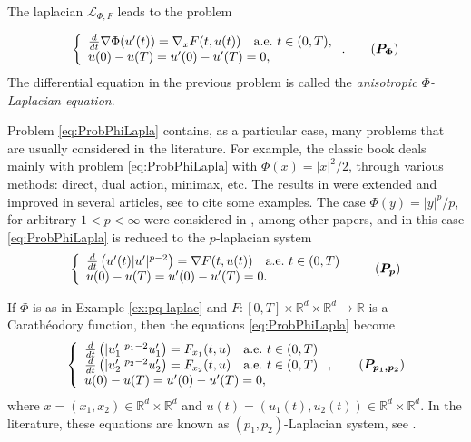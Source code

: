 \documentclass[twoside]{article}
\theoremstyle{remark}
\renewcommand{\b}[1]{\boldsymbol{#1}}
\newcommand{\rr}{\mathbb{R}}
\newcounter{example}[section]
\begin{document}
The laplacian $\mathcal{L}_{\Phi,F}$ leads to the problem

\begin{equation}\label{eq:ProbPhiLapla}
    \left\{%
\begin{array}{ll}
  \frac{d}{dt} \nabla \Phi(u'(t))= \nabla_{x}F(t,u(t)) \quad \hbox{a.e.}\ t \in (0,T),\\
    u(0)-u(T)=u'(0)-u'(T)=0,
\end{array}%
\right. .\tag{$\b{P_{\Phi}}$}
\end{equation}
The differential equation in the previous problem is called the \emph{anisotropic $\Phi$-Laplacian equation}.

Problem \eqref{eq:ProbPhiLapla} contains, as a particular case, many problems that are usually considered in the literature.  For example, the classic book  \cite{mawhin2010critical} deals mainly with problem \eqref{eq:ProbPhiLapla} with $\Phi(x)=|x|^2/2$, through various methods: direct, dual action, minimax, etc. The results in \cite{mawhin2010critical} were extended and improved in several articles,  see  \cite{tang1995periodic,tang1998periodic,wu1999periodic,tang2001periodic,zhao2004periodic}  to cite some examples. The case $\Phi(y)=|y|^p/p$, for arbitrary $1<p<\infty$ were considered in  \cite{Tian2007192,tang2010periodic}, among other papers, and in this case \eqref{eq:ProbPhiLapla} is reduced to the $p$-laplacian system
\begin{equation}\label{ProbP-lapla}
    \left\{%
\begin{array}{ll}
   \frac{d}{dt}\left(u'(t)|u'|^{p-2}\right) = \nabla F(t,u(t)) \quad \hbox{a.e.}\ t \in (0,T)\\
    u(0)-u(T)=u'(0)-u'(T)=0.
\end{array}%
\right.\tag{$\b{P_p}$}
\end{equation}


If $\Phi$ is as in Example \ref{ex:pq-laplac} and  $F:[0,T]\times\rr^d\times\rr^d\to\rr$ is a Carath\'eodory function, then the equations \eqref{eq:ProbPhiLapla} become
\begin{equation}\label{eq:sist-p_lapa}
    \left\{%
\begin{array}{ll}
  \frac{d}{dt}\left(|u_1'|^{p_1-2}u_1'\right)=F_{x_1}(t,u) \quad \hbox{a.e.}\ t \in (0,T)\\
  \frac{d}{dt}\left(|u_2'|^{p_2-2}u_2'\right)=F_{x_2}(t,u) \quad \hbox{a.e.}\ t \in (0,T)\\
   u(0)-u(T)=u'(0)-u'(T)=0,
\end{array}%
\right., \tag{$\b{P_{p_1,p_2}}$}
\end{equation}
where $x=(x_1,x_2)\in\rr^d\times\rr^d$ and $u(t)=(u_1(t),u_2(t))\in\rr^d\times\rr^d$. In the literature, these equations are known as $(p_1,p_2)$-Laplacian system, see
\cite{yang2013existence,pasca2016periodic,yang2012periodic,pasca2010periodic,pacsca2010some,pasca2011some,li2014periodic}.
\end{document}
